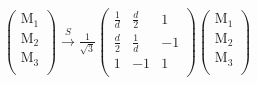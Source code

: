 \documentclass[12pt,a4paper]{article}
\newcounter{arrow}
\begin{document}
\begin{align}
\left( \begin{matrix}
\text{M}_1\\
\text{M}_2\\
\text{M}_3\\
\end{matrix} \right) \xrightarrow{S} 
\frac{1}{\sqrt{3}}\left( \begin{matrix}
\frac{1}{d} & \frac{d}{2} & 1\\ 
\frac{d}{2} & \frac{1}{d} & -1\\
1 & -1 & 1\\
\end{matrix} \right)
\left( \begin{matrix}
\text{M}_1\\
\text{M}_2\\
\text{M}_3\\
\end{matrix} \right)
\end{align}
\end{document}
